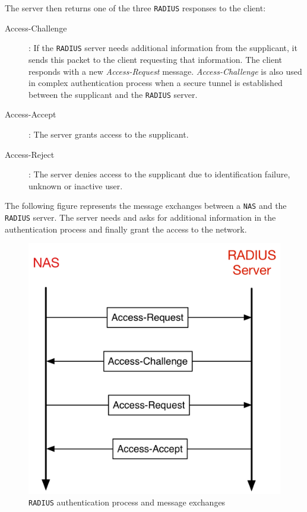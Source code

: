 The server then returns one of the three \texttt{RADIUS} responses to the client:
	\begin{description}
		\item [Access-Challenge]: If the \texttt{RADIUS} server needs additional information from the supplicant, it sends this packet to the client requesting that information. The client responds with a new \textit{Access-Request} message. \textit{Access-Challenge} is also used in complex authentication process when a secure tunnel is established between the supplicant and the \texttt{RADIUS} server.

		\item [Access-Accept]: The server grants access to the supplicant.

		\item [Access-Reject]: The server denies access to the supplicant due to identification failure, unknown or inactive user.
	\end{description}

The following figure represents the message exchanges between a \texttt{NAS} and the \texttt{RADIUS} server. The server needs and asks for additional information in the authentication process and finally grant the access to the network.

\begin{figure}[H]
	\begin{center}
		\includegraphics[width=.5\linewidth]{Pictures/chapter2/radius-authentication.png}
		\caption{\texttt{RADIUS} authentication process and message exchanges}
	\end{center}
\end{figure}
		
